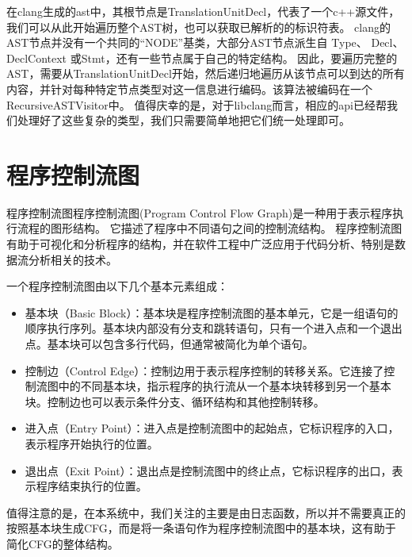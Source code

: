在clang生成的ast中，其根节点是TranslationUnitDecl，代表了一个c++源文件，我们可以从此开始遍历整个AST树，也可以获取已解析的的标识符表。
clang的AST节点并没有一个共同的“NODE”基类，大部分AST节点派生自 Type、 Decl、 DeclContext 或Stmt，还有一些节点属于自己的特定结构。
因此，要遍历完整的AST，需要从TranslationUnitDecl开始，然后递归地遍历从该节点可以到达的所有内容，并针对每种特定节点类型对这一信息进行编码。该算法被编码在一个RecursiveASTVisitor中。
值得庆幸的是，对于libclang而言，相应的api已经帮我们处理好了这些复杂的类型，我们只需要简单地把它们统一处理即可。


\section{程序控制流图}
程序控制流图程序控制流图(Program Control Flow Graph)是一种用于表示程序执行流程的图形结构。
它描述了程序中不同语句之间的控制流结构。
程序控制流图有助于可视化和分析程序的结构，并在软件工程中广泛应用于代码分析、特别是数据流分析相关的技术。

一个程序控制流图由以下几个基本元素组成：
\begin{itemize}
	\item 基本块（Basic Block）：基本块是程序控制流图的基本单元，它是一组语句的顺序执行序列。基本块内部没有分支和跳转语句，只有一个进入点和一个退出点。基本块可以包含多行代码，但通常被简化为单个语句。
    \item 控制边（Control Edge）：控制边用于表示程序控制的转移关系。它连接了控制流图中的不同基本块，指示程序的执行流从一个基本块转移到另一个基本块。控制边也可以表示条件分支、循环结构和其他控制转移。
    \item 进入点（Entry Point）：进入点是控制流图中的起始点，它标识程序的入口，表示程序开始执行的位置。
    \item 退出点（Exit Point）：退出点是控制流图中的终止点，它标识程序的出口，表示程序结束执行的位置。
\end{itemize}
值得注意的是，在本系统中，我们关注的主要是由日志函数，所以并不需要真正的按照基本块生成CFG，而是将一条语句作为程序控制流图中的基本块，这有助于简化CFG的整体结构。

